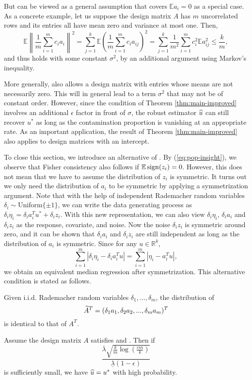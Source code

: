 But \conditionA{} can be viewed as a general assumption that covers $\mathbb{E}a_i=0$ as a special case. As a concrete example, let us suppose the design matrix $A$ has $m$ uncorrelated rows and its entries all have mean zero and variance at most one. Then,
$$\mathbb{E}\left\|\frac{1}{m}\sum_{i=1}^mc_ia_i\right\|^2=\sum_{j=1}^k\mathbb{E}\left(\frac{1}{m}\sum_{i=1}^mc_ia_{ij}\right)^2=\sum_{j=1}^k\frac{1}{m^2}\sum_{i=1}^mc_i^2\mathbb{E}a_{ij}^2\leq \frac{k}{m},$$
and thus \conditionA{} holds with some constant $\sigma^2$, by an additional argument using Markov's inequality.

More generally, \conditionA{} also allows a design matrix with entries whose means are not necessarily zero. This will in general lead to a term $\sigma^2$ that may not be of constant order. However, since the condition of Theorem \ref{thm:main-improved} involves an additional $\epsilon$ factor in front of $\sigma$, the robust estimator $\widehat{u}$ can still recover $u^*$ as long as the contamination proportion is vanishing at an appropriate rate. As an important application, the result of Theorem \ref{thm:main-improved} also applies to design matrices with an intercept.

To close this section, we introduce an alternative of \conditionA. By (\ref{eq:pop-insight}), we observe that Fisher consistency also follows if $\mathbb{E}\mathop{\rm sign}(z_i)=0$. However, this does not mean that we have to assume the distribution of $z_i$ is symmetric. It turns out we only need the distribution of $a_i$ to be symmetric by applying a symmetrization argument.
Note that with the help of independent Rademacher random variables $\delta_i\sim\text{Uniform}\{\pm 1\}$, we can write the data generating process as $\delta_i\eta_i=\delta_ia_i^Tu^*+\delta_iz_i$. With this new representation, we can also view $\delta_i\eta_i$, $\delta_ia_i$ and $\delta_iz_i$ as the response, covariate, and noise. Now the noise $\delta_iz_i$ is symmetric around zero, and it can be shown that $\delta_ia_i$ and $\delta_iz_i$ are still independent as long as the distribution of $a_i$ is symmetric. Since for any $u\in\mathbb{R}^k$,
$$\sum_{i=1}^m|\delta_i\eta_i- \delta_ia_i^Tu|=\sum_{i=1}^m|\eta_i-a_i^Tu|,$$
we obtain an equivalent median regression after symmetrization.
This alternative condition is stated as follows.


\begin{con1}
Given i.i.d. Rademacher random variables $\delta_1,...,\delta_m$, the distribution of
$$\widetilde{A}^T=(\delta_1a_1,\delta_2a_2,...,\delta_ma_m)^T$$
is identical to that of $A^T$.
\end{con1}

\begin{thm}\label{thm:robust-reg}
Assume the design matrix $A$ satisfies \conditionAp{} and \conditionB. Then if $$\frac{\overline{\lambda}\sqrt{\frac{k}{m}\log\left(\frac{em}{k}\right)}}{\underline{\lambda}(1-\epsilon)}$$
is sufficiently small, we have $\widehat{u}=u^*$ with high probability.
\end{thm}
